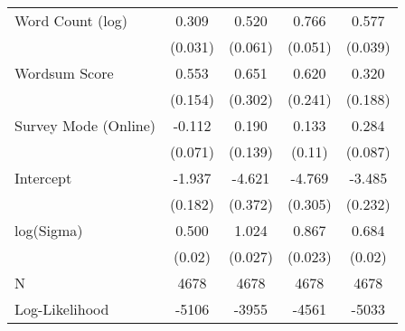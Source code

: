\begin{table}[ht]
\begin{tabular}{lcccc}
  Word Count (log) &  0.309 &  0.520 &  0.766 &  0.577 \\ 
   & (0.031) & (0.061) & (0.051) & (0.039) \\ 
  Wordsum Score &  0.553 &  0.651 &  0.620 &  0.320 \\ 
   & (0.154) & (0.302) & (0.241) & (0.188) \\ 
  Survey Mode (Online) & -0.112 &  0.190 &  0.133 &  0.284 \\ 
   & (0.071) & (0.139) & (0.11) & (0.087) \\ 
  Intercept & -1.937 & -4.621 & -4.769 & -3.485 \\ 
   & (0.182) & (0.372) & (0.305) & (0.232) \\ 
  log(Sigma) &  0.500 &  1.024 &  0.867 &  0.684 \\ 
   & (0.02) & (0.027) & (0.023) & (0.02) \\ 
   \hline
N & 4678 & 4678 & 4678 & 4678 \\ 
  Log-Likelihood & -5106 & -3955 & -4561 & -5033 \\ 
   \hline
\end{tabular}
\endgroup
\end{table}
